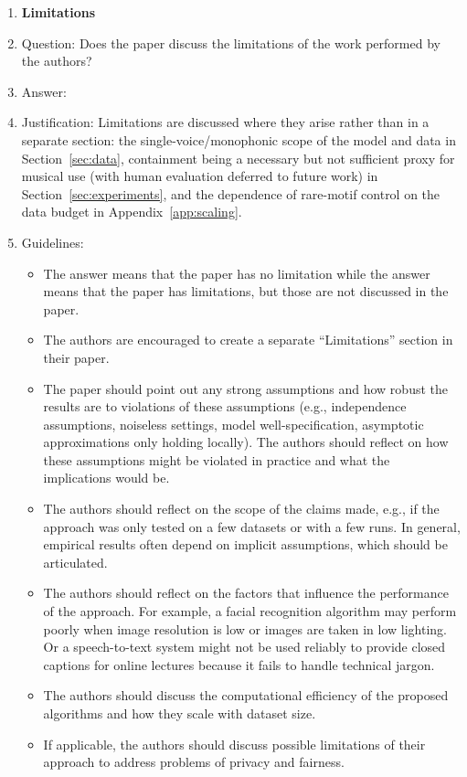 \documentclass{article}
\begin{document}
\begin{enumerate}
\item {\bf Limitations}
    \item[] Question: Does the paper discuss the limitations of the work performed by the authors?
    \item[] Answer: \answerYes{}
    \item[] Justification: Limitations are discussed where they arise rather than in a separate section: the single-voice/monophonic scope of the model and data in Section~\ref{sec:data}, containment being a necessary but not sufficient proxy for musical use (with human evaluation deferred to future work) in Section~\ref{sec:experiments}, and the dependence of rare-motif control on the data budget in Appendix~\ref{app:scaling}.
    \item[] Guidelines:
    \begin{itemize}
        \item The answer \answerNA{} means that the paper has no limitation while the answer \answerNo{} means that the paper has limitations, but those are not discussed in the paper. 
        \item The authors are encouraged to create a separate ``Limitations'' section in their paper.
        \item The paper should point out any strong assumptions and how robust the results are to violations of these assumptions (e.g., independence assumptions, noiseless settings, model well-specification, asymptotic approximations only holding locally). The authors should reflect on how these assumptions might be violated in practice and what the implications would be.
        \item The authors should reflect on the scope of the claims made, e.g., if the approach was only tested on a few datasets or with a few runs. In general, empirical results often depend on implicit assumptions, which should be articulated.
        \item The authors should reflect on the factors that influence the performance of the approach. For example, a facial recognition algorithm may perform poorly when image resolution is low or images are taken in low lighting. Or a speech-to-text system might not be used reliably to provide closed captions for online lectures because it fails to handle technical jargon.
        \item The authors should discuss the computational efficiency of the proposed algorithms and how they scale with dataset size.
        \item If applicable, the authors should discuss possible limitations of their approach to address problems of privacy and fairness.

\end{itemize}
\end{enumerate}
\end{document}
